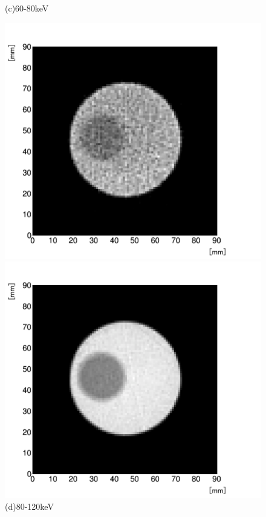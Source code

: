 \begin{figure}[H]
\begin{minipage}{0.5\hsize}
\begin{center}
  \end{center}  
\vspace{-1cm}
\caption*{(c)60-80keV}
 \end{minipage}
 \begin{minipage}{0.5\hsize}
  \begin{center}
   \includegraphics[bb=0.000000 0.000000 586.511515 539.955364,width=1.0\hsize]{image2/chapter5/low_contrast_90-120.png}
  \end{center}
\vspace{-1cm}
\caption*{(d)80-120keV}
 \end{minipage}
 \begin{minipage}{0.5\hsize}
  \begin{center}
   \includegraphics[bb=0.000000 0.000000 586.511515 539.955364,width=1.0\hsize]{image2/chapter5/low_contrast_20-120.png}

\end{center}
\end{minipage}
\end{figure}
